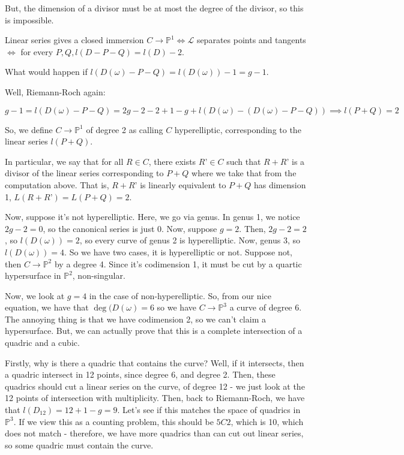 \documentclass[10pt]{article}
\begin{document}
But, the dimension of a divisor must be at most the degree of the divisor, so this is impossible.

Linear series gives a closed immersion $C \to \mathbb{P}^1 \iff \mathcal{L} $ separates points and tangents $\iff$ for every $P,Q, l(D - P - Q) = l(D)- 2$.

What would happen if $l(D(\omega) - P - Q) = l(D(\omega)) -1 = g- 1$.

Well, Riemann-Roch again:

$$ g - 1 = l(D(\omega) - P - Q) = 2g - 2 - 2 + 1 - g + l(D(\omega) - (D(\omega) - P - Q))  \implies l(P+Q) = 2$$ 

So, we define $C \to \mathbb{P}^1$ of degree 2 as calling $C$ hyperelliptic, corresponding to the linear series $l(P+Q)$.

In particular, we say that for all $R \in C$, there exists $R’ \in C$ such that $R + R’$ is a divisor of the linear series corresponding to $P + Q$ where we take that from the computation above. That is, $R + R’$ is linearly equivalent to $P + Q$ has dimension 1, $L(R + R’) = L(P + Q) = 2$.

Now, suppose it’s not hyperelliptic. Here, we go via genus. In genus 1, we notice $2g - 2 = 0$, so the canonical series is just 0. Now, suppose $g = 2$. Then, $2g - 2 = 2$, so $l(D(\omega)) = 2$, so every curve of genus 2 is hyperelliptic. Now, genus 3, so $l(D(\omega)) = 4$. So we have two cases, it is hyperelliptic or not. Suppose not, then $C \to \mathbb{P}^2$ by a degree 4. Since it’s codimension 1, it must be cut by a quartic hypersurface in $\mathbb{P}^2$, non-singular. 

Now, we look at $g = 4$ in the case of non-hyperelliptic. So, from our nice equation, we have that $\deg (D(\omega) = 6$ so we have $C \to \mathbb{P}^3$ a curve of degree 6. The annoying thing is that we have codimension 2, so we can’t claim a hypersurface. But, we can actually prove that this is a complete intersection of a quadric and a cubic.

Firstly, why is there a quadric that contains the curve? Well, if it intersects, then a quadric intersect in 12 points, since degree 6, and degree 2. Then, these quadrics should cut a linear series on the curve, of degree 12 - we just look at the 12 points of intersection with multiplicity. Then, back to Riemann-Roch, we have that $l(D_{12}) = 12 + 1 - g = 9$. Let’s see if this matches the space of quadrics in $\mathbb{P}^3$. If we view this as a counting problem, this should be $5C2$, which is 10, which does not match - therefore, we have more quadrics than can cut out linear series, so some quadric must contain the curve.
\end{document}
